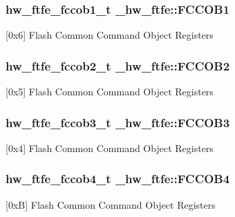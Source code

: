 \subsubsection[{\texorpdfstring{F\+C\+C\+O\+B1}{FCCOB1}}]{ {\bf hw\+\_\+ftfe\+\_\+fccob1\+\_\+t} \+\_\+hw\+\_\+ftfe\+::\+F\+C\+C\+O\+B1}\hypertarget{struct__hw__ftfe_a60995233091086ff781beeefc771194b}{}\label{struct__hw__ftfe_a60995233091086ff781beeefc771194b}
\mbox{[}0x6\mbox{]} Flash Common Command Object Registers 
\subsubsection[{\texorpdfstring{F\+C\+C\+O\+B2}{FCCOB2}}]{ {\bf hw\+\_\+ftfe\+\_\+fccob2\+\_\+t} \+\_\+hw\+\_\+ftfe\+::\+F\+C\+C\+O\+B2}\hypertarget{struct__hw__ftfe_a22e53e04428de647b83135c0a11cffd5}{}\label{struct__hw__ftfe_a22e53e04428de647b83135c0a11cffd5}
\mbox{[}0x5\mbox{]} Flash Common Command Object Registers 
\subsubsection[{\texorpdfstring{F\+C\+C\+O\+B3}{FCCOB3}}]{ {\bf hw\+\_\+ftfe\+\_\+fccob3\+\_\+t} \+\_\+hw\+\_\+ftfe\+::\+F\+C\+C\+O\+B3}\hypertarget{struct__hw__ftfe_a68a3ec45aa4728737cd5eef993c159ce}{}\label{struct__hw__ftfe_a68a3ec45aa4728737cd5eef993c159ce}
\mbox{[}0x4\mbox{]} Flash Common Command Object Registers 
\subsubsection[{\texorpdfstring{F\+C\+C\+O\+B4}{FCCOB4}}]{ {\bf hw\+\_\+ftfe\+\_\+fccob4\+\_\+t} \+\_\+hw\+\_\+ftfe\+::\+F\+C\+C\+O\+B4}\hypertarget{struct__hw__ftfe_ad56b36126ae6f2e323e47912ee6fc37c}{}\label{struct__hw__ftfe_ad56b36126ae6f2e323e47912ee6fc37c}
\mbox{[}0xB\mbox{]} Flash Common Command Object Registers 
